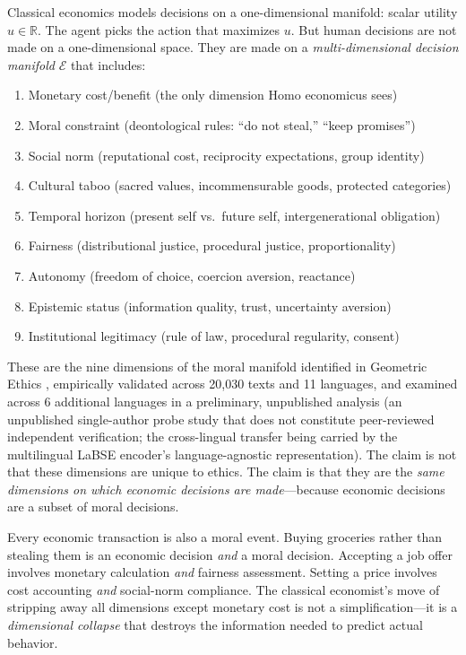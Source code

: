 \documentclass[12pt]{article}
\theoremstyle{definition}
\theoremstyle{remark}
\newcommand{\E}{\mathcal{E}}               %
\newcommand{\R}{\mathbb{R}}
\begin{document}
Classical economics models decisions on a one-dimensional manifold: scalar utility $u \in \R$.  The agent picks the action that maximizes $u$.  But human decisions are not made on a one-dimensional space.  They are made on a \emph{multi-dimensional decision manifold} $\E$ that includes:

\begin{enumerate}
    \item Monetary cost/benefit (the only dimension Homo economicus sees)
    \item Moral constraint (deontological rules: ``do not steal,'' ``keep promises'')
    \item Social norm (reputational cost, reciprocity expectations, group identity)
    \item Cultural taboo (sacred values, incommensurable goods, protected categories)
    \item Temporal horizon (present self vs.\ future self, intergenerational obligation)
    \item Fairness (distributional justice, procedural justice, proportionality)
    \item Autonomy (freedom of choice, coercion aversion, reactance)
    \item Epistemic status (information quality, trust, uncertainty aversion)
    \item Institutional legitimacy (rule of law, procedural regularity, consent)
\end{enumerate}

These are the nine dimensions of the moral manifold identified in Geometric Ethics \cite{bond2026geometric}, empirically validated across 20,030 texts and 11 languages, and examined across 6 additional languages in a preliminary, unpublished analysis \cite{thiele2026} (an unpublished single-author probe study that does not constitute peer-reviewed independent verification; the cross-lingual transfer being carried by the multilingual LaBSE encoder's language-agnostic representation).  The claim is not that these dimensions are unique to ethics.  The claim is that they are the \emph{same dimensions on which economic decisions are made}---because economic decisions are a subset of moral decisions.

Every economic transaction is also a moral event.  Buying groceries rather than stealing them is an economic decision \emph{and} a moral decision.  Accepting a job offer involves monetary calculation \emph{and} fairness assessment.  Setting a price involves cost accounting \emph{and} social-norm compliance.  The classical economist's move of stripping away all dimensions except monetary cost is not a simplification---it is a \emph{dimensional collapse} that destroys the information needed to predict actual behavior.
\end{document}
